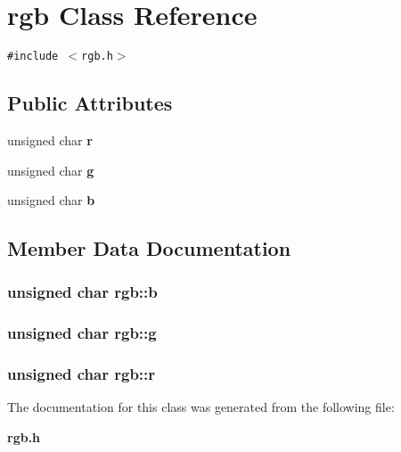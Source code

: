\section{rgb Class Reference}
\label{classrgb}
{\tt \#include $<$rgb.h$>$}

\subsection*{Public Attributes}
\begin{CompactItemize}
\item 
unsigned char {\bf r}
\item 
unsigned char {\bf g}
\item 
unsigned char {\bf b}
\end{CompactItemize}


\subsection{Member Data Documentation}
\subsubsection[{b}]{\setlength{\rightskip}{0pt plus 5cm}unsigned char {\bf rgb::b}}\label{classrgb_e99e63aa161acf8066058b7af8b3e02c}


\subsubsection[{g}]{\setlength{\rightskip}{0pt plus 5cm}unsigned char {\bf rgb::g}}\label{classrgb_aa90468fc445cd4003cea65a84dea3e8}


\subsubsection[{r}]{\setlength{\rightskip}{0pt plus 5cm}unsigned char {\bf rgb::r}}\label{classrgb_2e51db126cff93863d52bb429fbc422d}




The documentation for this class was generated from the following file:\begin{CompactItemize}
\item 
{\bf rgb.h}\end{CompactItemize}

